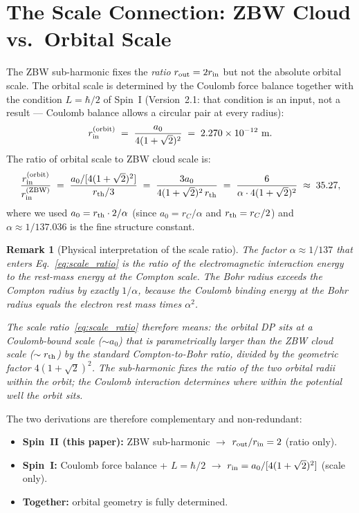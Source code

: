 \documentclass[12pt]{article}
\newtheorem{remark}[theorem]{Remark}
\newcommand{\rC}{r_C}
\newcommand{\rth}{r_{\rm th}}
\newcommand{\rin}{r_{\rm in}}
\newcommand{\rout}{r_{\rm out}}
\newcommand{\aBohr}{a_0}
\begin{document}
\section{The Scale Connection: ZBW Cloud vs.\ Orbital Scale}
\label{sec:scale}

The ZBW sub-harmonic fixes the \emph{ratio} $\rout = 2\rin$ but not
the absolute orbital scale.  The orbital scale is determined by the
Coulomb force balance together with the condition $L = \hbar/2$ of Spin~I
(Version~2.1: that condition is an input, not a result --- Coulomb balance
allows a circular pair at every radius):
\begin{equation}
  \rin^{\rm (orbit)} \;=\; \frac{\aBohr}{4(1+\sqrt{2})^2}
  \;=\; 2.270\times 10^{-12}\ \text{m}.
  \label{eq:orbital_scale}
\end{equation}
The ratio of orbital scale to ZBW cloud scale is:
\begin{equation}
  \frac{\rin^{\rm (orbit)}}{\rin^{\rm (ZBW)}}
  \;=\; \frac{\aBohr/[4(1+\sqrt{2})^2]}{\rth/3}
  \;=\; \frac{3\aBohr}{4(1+\sqrt{2})^2\,\rth}
  \;=\; \frac{6}{\alpha\cdot 4(1+\sqrt{2})^2}
  \;\approx\; 35.27,
  \label{eq:scale_ratio}
\end{equation}
where we used $\aBohr = \rth\cdot 2/\alpha$ (since $\aBohr = \rC/\alpha$
and $\rth = \rC/2$) and $\alpha \approx 1/137.036$ is the fine
structure constant.

\begin{remark}[Physical interpretation of the scale ratio]
The factor $\alpha \approx 1/137$ that enters Eq.~\eqref{eq:scale_ratio}
is the ratio of the electromagnetic interaction energy to the rest-mass
energy at the Compton scale.  The Bohr radius exceeds the Compton
radius by exactly $1/\alpha$, because the Coulomb binding energy at
the Bohr radius equals the electron rest mass times $\alpha^2$.

The scale ratio~\eqref{eq:scale_ratio} therefore means: the orbital
DP sits at a Coulomb-bound scale ($\sim\aBohr$) that is parametrically
larger than the ZBW cloud scale ($\sim\rth$) by the standard
Compton-to-Bohr ratio, divided by the geometric factor $4(1+\sqrt{2})^2$.
The sub-harmonic fixes the ratio of the two orbital radii within the
orbit; the Coulomb interaction determines where within the potential
well the orbit sits.
\end{remark}

The two derivations are therefore complementary and non-redundant:
\begin{itemize}[noitemsep]
  \item \textbf{Spin~II (this paper):} ZBW sub-harmonic $\to$
    $\rout/\rin = 2$ (ratio only).
  \item \textbf{Spin~I:} Coulomb force balance + $L = \hbar/2$
    $\to$ $\rin = \aBohr/[4(1+\sqrt{2})^2]$ (scale only).
  \item \textbf{Together:} orbital geometry is fully determined.
\end{itemize}
\end{document}
